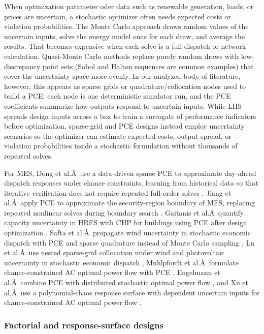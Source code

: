 When optimization parameter oder data such as renewable generation,
loads, or prices are uncertain, a stochastic optimizer often needs
expected costs or violation probabilities. The Monte Carlo approach
draws random values of the uncertain inputs, solve the energy model once
for each draw, and average the results. That becomes expensive when each
solve is a full dispatch or network calculation. Quasi-Monte Carlo
methods replace purely random draws with low-discrepancy point sets
(Sobol and Halton sequences are common examples) that cover the
uncertainty space more evenly. In our analyzed body of literature,
however, this appears as sparse grids or quadrature/collocation nodes
used to build a PCE: each node is one deterministic simulator run, and
the PCE coefficients summarize how outputs respond to uncertain inputs.
While LHS spreads design inputs across a box to train a surrogate of
performance indicators before optimization, sparse-grid and PCE designs
instead employ uncertainty scenarios so the optimizer can estimate
expected costs, output spread, or violation probabilities inside a
stochastic formulation without thousands of repeated solves.

For MES, Dong et al.Â~use a data-driven sparse PCE to approximate
day-ahead dispatch responses under chance constraints, learning from
historical data so that iterative verification does not require repeated
full-order solves \cite{Dong2023}. Jiang et al.Â~apply PCE to approximate the
security-region boundary of MES, replacing repeated nonlinear solves
during boundary search \cite{Jiang2026620}. Gaitanis et al.Â~quantify
capacity uncertainty in HRES with CHP for buildings using PCE after
design optimization \cite{Gaitanis2026}. Safta et al.Â~propagate wind
uncertainty in stochastic economic dispatch with PCE and sparse
quadrature instead of Monte Carlo sampling \cite{Safta20172535}, Lu et
al.Â~use nested sparse-grid collocation under wind and photovoltaic
uncertainty in stochastic economic dispatch \cite{Lu201991827}, Muhlpfordt
et al.Â~formulate chance-constrained AC optimal power flow with PCE
\cite{Muhlpfordt20194806}, Engelmann et al.Â~combine PCE with distributed
stochastic optimal power flow \cite{Engelmann20186188}, and Xu et al.Â~use a
polynomial-chaos response surface with dependent uncertain inputs for
chance-constrained AC optimal power flow \cite{Xu20212696}.

\subsubsection{Factorial and response-surface designs}

